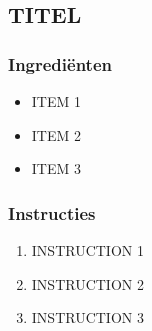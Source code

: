 \subsection{TITEL}
\subsubsection*{Ingrediënten}
\begin{multicols}{2}
    \begin{itemize}
        \item ITEM 1
        \item ITEM 2
        \item ITEM 3
    \end{itemize}
\end{multicols}

\subsubsection*{Instructies}
\begin{enumerate}
    \item INSTRUCTION 1
    \item INSTRUCTION 2
    \item INSTRUCTION 3
\end{enumerate}